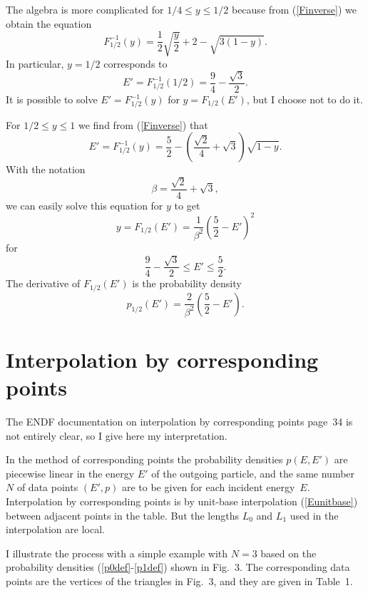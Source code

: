 \documentclass[11pt]{article}
\begin{document}
The algebra is more complicated for $1/4 \le y \le 1/2$ because
from (\ref{Finverse}) we obtain the equation
\[
  F_{1/2}^{-1}(y) = \frac{1}{2} \sqrt{ \frac {y}{2} } + 2
   - \sqrt{ 3(1 - y) }.
\]
In particular, $y = 1/2$ corresponds to
\[
  E' = F_{1/2}^{-1}(1/2) = \frac{9}{4} - \frac{\sqrt{3}}{2}.
\]
It is possible to solve $E' = F_{1/2}^{-1}(y)$ for $y = F_{1/2}(E')$,
but I choose not to do it.

For $1/2 \le y \le 1$ we find from (\ref{Finverse}) that
\[
  E' = F_{1/2}^{-1}(y) = \frac{5}{2} -
    \left(
      \frac { \sqrt{2} }{4} + \sqrt{3}
    \right)
   \sqrt{ 1 - y }.
\]
With the notation
\[
  \beta = \frac { \sqrt{2} }{4} + \sqrt{3},
\]
we can easily solve this equation for $y$ to get
\[
  y = F_{1/2}(E') = \frac{1}{\beta^2}
  \left(
    \frac{5}{2} - E'
  \right)^2
\]
for 
\[
  \frac{9}{4} - \frac{\sqrt{3}}{2} \le E' \le \frac{5}{2}.
\]
The derivative of $F_{1/2}(E')$ is the probability density
\[
  p_{1/2}(E') = \frac{2}{\beta^2}
  \left(
    \frac{5}{2} - E'
  \right).
\]

\section{Interpolation by corresponding points}
The ENDF documentation on interpolation by corresponding points
\cite{ENDF} page~34
is not entirely clear, so I give here my interpretation.

In the method of corresponding points the probability densities
$p(E, E')$ are piecewise linear in the energy $E'$ of the outgoing
particle, and the same number $N$ of data points $(E', p)$
are to be given for each incident energy~$E$.  Interpolation by
corresponding points is by unit-base interpolation (\ref{Eunitbase})
between adjacent points in the table.  But the lengths $L_0$
and $L_1$ used in the interpolation are local.

\begin{figure}

\end{figure}


I illustrate the process with a simple example with $N = 3$
based on the probability densities (\ref{p0def}-\ref{p1def})
shown in Fig.~3.  The corresponding data points are the
vertices of the triangles in Fig.~3, and they are given
in Table~1.
\end{document}
